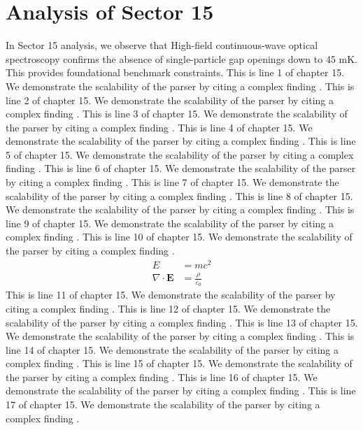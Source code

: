 \chapter{Analysis of Sector 15}

In Sector 15 analysis, we observe that High-field continuous-wave optical spectroscopy confirms the absence of single-particle gap openings down to 45 mK. This provides foundational benchmark constraints.
This is line 1 of chapter 15. We demonstrate the scalability of the parser by citing a complex finding \cite{ref15_1}.
This is line 2 of chapter 15. We demonstrate the scalability of the parser by citing a complex finding \cite{ref15_2}.
This is line 3 of chapter 15. We demonstrate the scalability of the parser by citing a complex finding \cite{ref15_3}.
This is line 4 of chapter 15. We demonstrate the scalability of the parser by citing a complex finding \cite{ref15_4}.
This is line 5 of chapter 15. We demonstrate the scalability of the parser by citing a complex finding \cite{ref15_5}.
This is line 6 of chapter 15. We demonstrate the scalability of the parser by citing a complex finding \cite{ref15_6}.
This is line 7 of chapter 15. We demonstrate the scalability of the parser by citing a complex finding \cite{ref15_7}.
This is line 8 of chapter 15. We demonstrate the scalability of the parser by citing a complex finding \cite{ref15_8}.
This is line 9 of chapter 15. We demonstrate the scalability of the parser by citing a complex finding \cite{ref15_9}.
This is line 10 of chapter 15. We demonstrate the scalability of the parser by citing a complex finding \cite{ref15_10}.
\begin{align*}
  E &= mc^2 \\
  \nabla \cdot \mathbf{E} &= \frac{\rho}{\varepsilon_0}
\end{align*}
This is line 11 of chapter 15. We demonstrate the scalability of the parser by citing a complex finding \cite{ref15_11}.
This is line 12 of chapter 15. We demonstrate the scalability of the parser by citing a complex finding \cite{ref15_12}.
This is line 13 of chapter 15. We demonstrate the scalability of the parser by citing a complex finding \cite{ref15_13}.
This is line 14 of chapter 15. We demonstrate the scalability of the parser by citing a complex finding \cite{ref15_14}.
This is line 15 of chapter 15. We demonstrate the scalability of the parser by citing a complex finding \cite{ref15_15}.
This is line 16 of chapter 15. We demonstrate the scalability of the parser by citing a complex finding \cite{ref15_16}.
This is line 17 of chapter 15. We demonstrate the scalability of the parser by citing a complex finding \cite{ref15_17}.
